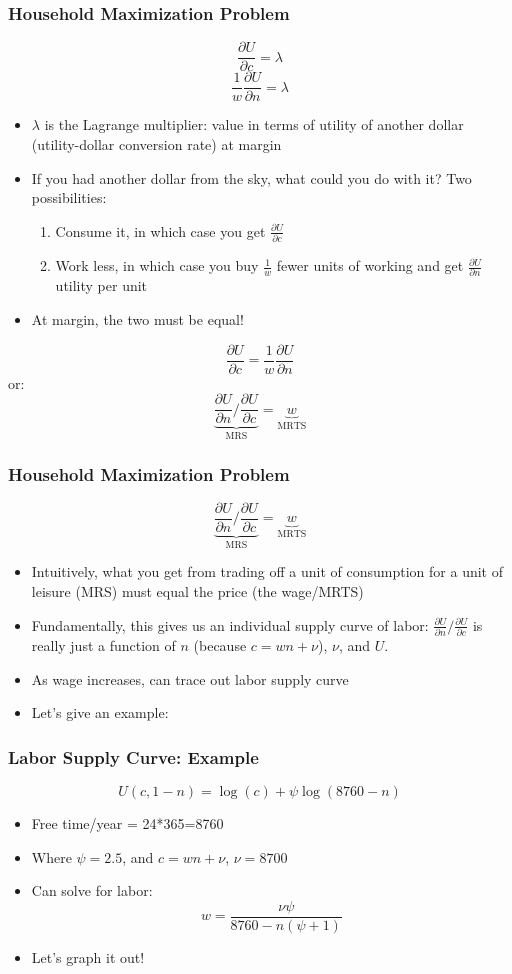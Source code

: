 \documentclass{beamer}
\begin{document}
\begin{frame}
\frametitle[alignment=center]{Household Maximization Problem}
$$\frac{\partial U}{\partial c}=\lambda$$
$$\frac{1}{w}\frac{\partial U}{\partial n}=\lambda$$
\begin{itemize}
\item $\lambda$ is the Lagrange multiplier:  value in terms of utility of another dollar (utility-dollar conversion rate) at margin
\item If you had another dollar from the sky, what could you do with it?  Two possibilities:
\begin{enumerate} 
\item Consume it, in which case you get $\frac{\partial U}{\partial c}$
\item Work less, in which case you buy $\frac{1}{w}$ fewer units of working and get $\frac{\partial U}{\partial n}$ utility per unit
\end{enumerate}
\item At margin, the two must be equal!
\end{itemize}
$$\frac{\partial U}{\partial c}=\frac{1}{w}\frac{\partial U}{\partial n}$$
or:
\small
$$\underbrace{\frac{\partial U}{\partial n}/\frac{\partial U}{\partial c}}_{\text{MRS}}=\underbrace{w}_{\text{MRTS}}$$
\end{frame}

\begin{frame}
\frametitle[alignment=center]{Household Maximization Problem}
$$\underbrace{\frac{\partial U}{\partial n}/\frac{\partial U}{\partial c}}_{\text{MRS}}=\underbrace{w}_{\text{MRTS}}$$
\begin{itemize}
\item Intuitively, what you get from trading off a unit of consumption for a unit of leisure (MRS) must equal the price (the wage/MRTS)
\bigskip
\item Fundamentally, this gives us an individual supply curve of labor: $\frac{\partial U}{\partial n}/\frac{\partial U}{\partial c}$ is really just a function of $n$ (because $c=wn+\nu$), $\nu$, and $U$.
\bigskip
\item As wage increases, can trace out labor supply curve
\bigskip
\item Let's give an example:
\end{itemize}
\end{frame}

\begin{frame}
\frametitle[alignment=center]{Labor Supply Curve: Example}
$$U(c,1-n)=\log(c)+\psi\log(8760-n)$$
\begin{itemize}
\item Free time/year = 24*365=8760
\item Where $\psi=2.5$, and $c=wn+\nu$, $\nu=8700$
\item Can solve for labor:
$$w=\frac{\nu  \psi }{8760-n (\psi +1)}$$
\item Let's graph it out!
\end{itemize}
\end{frame}
\end{document}
